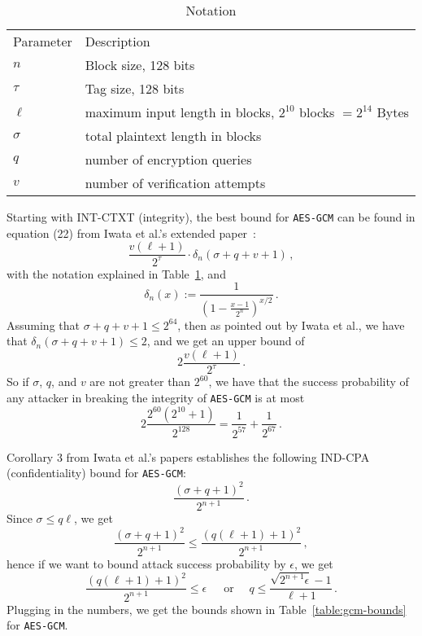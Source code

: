 \documentclass{article}
\newcommand{\defeq}{:=}
\begin{document}
\begin{table}[H]
  \centering
  \caption{Notation}\label{table:notation}
  \begin{tabular}{ll}
    \toprule
    Parameter & Description\\
    \cmidrule{1-2}
    $n$ & Block size, 128 bits\\
    $\tau$ & Tag size, 128 bits\\
    $\ell$ & maximum input length in blocks, $2^{10}$ blocks $ = 2^{14}$ Bytes\\
    $\sigma$ & total plaintext length in blocks\\
    $q$ & number of encryption queries\\
    $v$ & number of verification attempts\\
    \bottomrule
  \end{tabular}
\end{table}

Starting with INT-CTXT (integrity), the best bound for \texttt{AES-GCM} can be found in equation (22) from Iwata et al.'s extended paper~\cite{cryptoeprint:2012:438}:
\begin{equation}
  \frac{v(\ell+1)}{2^\tau}\cdot\delta_n(\sigma+q+v+1)\,,
\end{equation}
with the notation explained in Table~\ref{table:notation}, and
\begin{equation}
  \delta_n(x) \defeq \frac{1}{\left(1 - \frac{x-1}{2^n}\right)^{x/2}}\,.
\end{equation}
Assuming that $\sigma+q+v+1\le 2^{64}$, then as pointed out by Iwata et al., we have that $\delta_n(\sigma+q+v+1) \le 2$, and we get an upper bound of
\begin{equation}
  2\frac{v(\ell+1)}{2^\tau}\,.
\end{equation}
So if $\sigma$, $q$, and $v$ are not greater than $2^{60}$, we have that the success probability of any attacker in breaking the integrity of \texttt{AES-GCM} is at most
\begin{equation}
  2\frac{2^{60}(2^{10}+1)}{2^{128}} = \frac{1}{2^{57}} + \frac{1}{2^{67}}\,.
\end{equation}

Corollary 3 from Iwata et al.'s papers establishes the following IND-CPA (confidentiality) bound for \texttt{AES-GCM}:
\begin{equation}
  \frac{(\sigma+q+1)^2}{2^{n+1}}\,.
\end{equation}
Since $\sigma\le q\ell$, we get
\begin{equation}
  \frac{(\sigma+q+1)^2}{2^{n+1}} \le \frac{(q(\ell+1)+1)^2}{2^{n+1}}\,,
\end{equation}
hence if we want to bound attack success probability by $\epsilon$, we get
\begin{equation}\label{eq:querybound}
  \frac{(q(\ell+1)+1)^2}{2^{n+1}} \le \epsilon\,\quad\text{ or }\quad q \le \frac{\sqrt{2^{n+1}\epsilon}-1}{\ell+1}\,.
\end{equation}
Plugging in the numbers, we get the bounds shown in Table~\ref{table:gcm-bounds} for \texttt{AES-GCM}.



\end{document}
